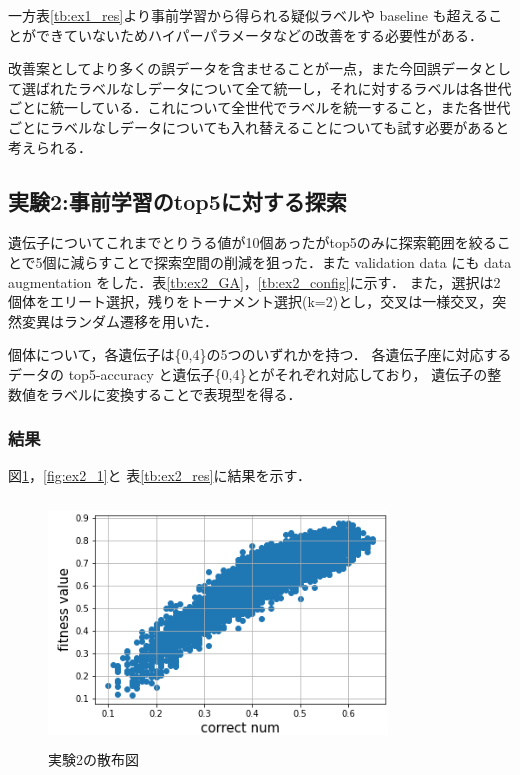 \documentclass[twocolumn]{jarticle}     %
\begin{document}
一方表\ref{tb:ex1_res}より事前学習から得られる疑似ラベルや baseline も超えることができていないためハイパーパラメータなどの改善をする必要性がある．

改善案としてより多くの誤データを含ませることが一点，また今回誤データとして選ばれたラベルなしデータについて全て統一し，それに対するラベルは各世代ごとに統一している．これについて全世代でラベルを統一すること，また各世代ごとにラベルなしデータについても入れ替えることについても試す必要があると考えられる．

\subsection{実験2:事前学習のtop5に対する探索}
遺伝子についてこれまでとりうる値が10個あったがtop5のみに探索範囲を絞ることで5個に減らすことで探索空間の削減を狙った．また validation data にも data augmentation をした．表\ref{tb:ex2_GA}，\ref{tb:ex2_config}に示す．
また，選択は2個体をエリート選択，残りをトーナメント選択(k=2)とし，交叉は一様交叉，突然変異はランダム遷移を用いた．

個体について，各遺伝子は\{0,4\}の5つのいずれかを持つ．
各遺伝子座に対応するデータの
 top5-accuracy と遺伝子\{0,4\}とがそれぞれ対応しており，
遺伝子の整数値をラベルに変換することで表現型を得る．

\subsubsection{結果}
図\ref{fig:ex2_3}，\ref{fig:ex2_1}と
表\ref{tb:ex2_res}に結果を示す．

\begin{figure}[h]
	\begin{center}
		\includegraphics[height=65mm,width=90mm]{ex2_scat.png}
		\caption{実験2の散布図\label{fig:ex2_3}}
	\end{center}
\end{figure}
\end{document}
